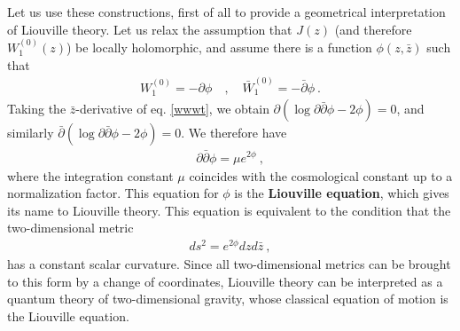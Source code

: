 \documentclass[12pt, a4paper, notitlepage, twoside]{report}
\numberwithin{equation}{section}
\theoremstyle{break}
\begin{document}
Let us use these constructions, first of all to provide a geometrical interpretation of Liouville theory.
Let us relax the assumption that $J(z)$ (and therefore $W_1^{(0)}(z)$) be locally holomorphic, and assume there is a function $\phi(z,\bar{z})$ such that 
\begin{align}
 W_1^{(0)} = - \partial \phi \quad , \quad \bar{W}_1^{(0)} = -\bar{\partial} \phi \ .
\end{align}
Taking the $\bar{z}$-derivative of eq. \eqref{wwwt}, we obtain $\partial\left(\log \partial\bar{\partial}\phi -2\phi\right)=0$, and similarly $\bar{\partial} \left(\log \partial\bar{\partial}\phi -2\phi\right)=0$.
We therefore have
\begin{align}
 \partial\bar{\partial}\phi = \mu e^{2\phi}\ ,
\end{align}
where the integration constant $\mu$ coincides with the cosmological constant up to a normalization factor.
This equation for $\phi$ is the \textbf{\boldmath Liouville equation}, which gives its name to Liouville theory.
This equation is equivalent to the condition that the two-dimensional metric
\begin{align}
 ds^2 = e^{2\phi} dz d\bar{z}\ ,
\end{align}
has a constant scalar curvature.
Since all two-dimensional metrics can be brought to this form by a change of coordinates, Liouville theory can be interpreted as a quantum theory of two-dimensional gravity, whose classical equation of motion is the Liouville equation.
\end{document}
